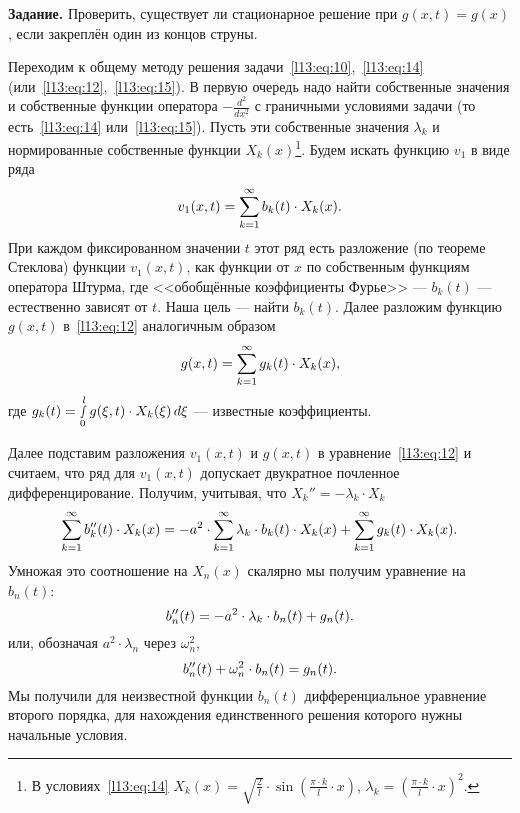 \documentclass[12pt,a4paper,openany,fleqn]{book}
\newcommand{\dder}[2]{\ensuremath{\frac{d^2#1}{d#2^2}}}
\theoremstyle{definition}
\begin{document}
	\noindent\textbf{Задание.} Проверить, существует ли стационарное решение при $g(x,t)=g(x)$, если закреплён один из концов струны.
	\vspace{0.2cm}
	
	Переходим к общему методу решения задачи~\eqref{l13:eq:10},~\eqref{l13:eq:14} (или~\eqref{l13:eq:12},~\eqref{l13:eq:15}). В первую очередь надо найти собственные значения и собственные функции оператора $\displaystyle-\dder{}{x}$ с граничными условиями задачи (то есть~\eqref{l13:eq:14} или~\eqref{l13:eq:15}). Пусть эти собственные значения $\lambda_k$ и нормированные собственные функции $X_k(x)$\footnote{В условиях~\eqref{l13:eq:14} $\displaystyle X_k(x)=\sqrt{\frac{2}{l}}\cdot\sin\left(\frac{\pi\cdot k}{l}\cdot x\right)$, $\displaystyle\lambda_k=\left(\frac{\pi\cdot k}{l}\cdot x\right)^2$.}. Будем искать функцию $v_1$ в виде ряда
	\begin{equation*}
		\hfill v_1(x,t)=\sum\limits_{k=1}^{\infty}b_k(t)\cdot X_k(x).\hfill
	\end{equation*}
	При каждом фиксированном значении $t$ этот ряд есть разложение (по теореме Стеклова) функции $v_1(x,t)$, как функции от $x$ по собственным функциям оператора Штурма, где <<обобщённые коэффициенты Фурье>> --- $b_k(t)$ --- естественно зависят от $t$. Наша цель --- найти $b_k(t)$. Далее разложим функцию $g(x,t)$ в~\eqref{l13:eq:12} аналогичным образом
	\begin{equation*}
		\hfill g(x,t)=\sum\limits_{k=1}^{\infty}g_k(t)\cdot X_k(x),\hfill
	\end{equation*}
	где $\displaystyle g_k(t)=\smallint\limits_0^l g(\xi,t)\cdot X_k(\xi)\,d\xi$ --- известные коэффициенты.
	
	Далее подставим разложения $v_1(x,t)$ и $g(x,t)$ в уравнение~\eqref{l13:eq:12} и считаем, что ряд для $v_1(x,t)$ допускает двукратное почленное дифференцирование. Получим, учитывая, что $X_k''=-\lambda_k\cdot X_k$
	\begin{equation*}
		\hfill\sum\limits_{k=1}^{\infty}b_k''(t)\cdot X_k(x)=-a^2\cdot\sum\limits_{k=1}^{\infty} \lambda_k\cdot b_k(t)\cdot X_k(x)+\sum\limits_{k=1}^{\infty}g_k(t)\cdot X_k(x).\hfill
	\end{equation*}
	Умножая это соотношение на $X_n(x)$ скалярно мы получим уравнение на $b_n(t)$:
	\begin{equation*}
		\hfill b_n''(t)=-a^2\cdot\lambda_k\cdot b_n(t)+g_n(t).\hfill
	\end{equation*}
	или, обозначая $a^2\cdot\lambda_n$ через $\omega_n^2$,
	\begin{equation}\label{l13:eq:19}
		\hfill b_n''(t)+\omega_n^2\cdot b_n(t)=g_n(t).\hfill
	\end{equation}
	Мы получили для неизвестной функции $b_n(t)$ дифференциальное уравнение второго порядка, для нахождения единственного решения которого нужны начальные условия. 
	
\end{document}
